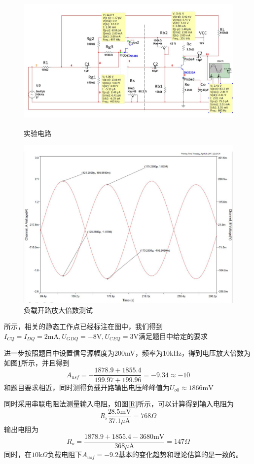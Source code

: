 \documentclass[UTF8,a4paper]{ctexart}
\begin{document}
\begin{figure}
\centering
\includegraphics[width=\textwidth]{cir.jpg}
\caption{实验电路}
\label{ACT}
\includegraphics[width=\textwidth]{A.jpg}
\caption{负载开路放大倍数测试}
\label{A}
\end{figure}
所示，相关的静态工作点已经标注在图中，我们得到$I_{CQ}=I_{DQ}=2\mathrm{mA},U_{GDQ}=-8\mathrm{V},U_{CEQ}=3\mathrm{V}$满足题目中给定的要求

进一步按照题目中设置信号源幅度为200mV，频率为10kHz，得到电压放大倍数为如图\ref{A}所示，并且得到
$$A_{usf}=-\frac{1878.9+1855.4}{199.97+199.96}=-9.34\approx -10$$
和题目要求相近，同时测得负载开路输出电压峰峰值为$U_{o0}\approx1866\mathrm{mV}$

同时采用串联电阻法测量输入电阻，如图\ref{R}所示，可以计算得到输入电阻为
$$R_i\frac{28.5\mathrm{mV}}{37.1\mu\mathrm{A}}=768\Omega$$
输出电阻为$$R_o=\frac{1878.9+1855.4-3680\mathrm{mV}}{368\mu\mathrm{A}}=147\Omega$$
同时，在$10\mathrm{k}\Omega$负载电阻下$A_{usf}=-9.2$基本的变化趋势和理论估算的是一致的。
\end{document}
